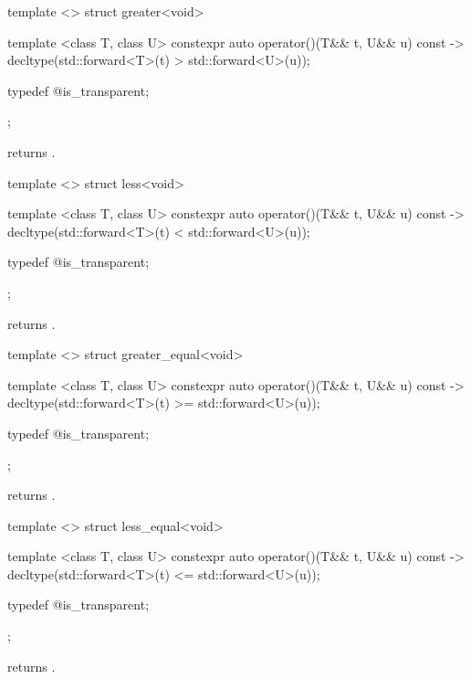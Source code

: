 %
\begin{itemdecl}
template <> struct greater<void> {
  template <class T, class U> constexpr auto operator()(T&& t, U&& u) const
    -> decltype(std::forward<T>(t) > std::forward<U>(u));

  typedef @\unspec@ is_transparent;
};
\end{itemdecl}

\begin{itemdescr}
\pnum
{} returns .
\end{itemdescr}

%
\begin{itemdecl}
template <> struct less<void> {
  template <class T, class U> constexpr auto operator()(T&& t, U&& u) const
    -> decltype(std::forward<T>(t) < std::forward<U>(u));

  typedef @\unspec@ is_transparent;
};
\end{itemdecl}

\begin{itemdescr}
\pnum
{} returns .
\end{itemdescr}

%
\begin{itemdecl}
template <> struct greater_equal<void> {
  template <class T, class U> constexpr auto operator()(T&& t, U&& u) const
    -> decltype(std::forward<T>(t) >= std::forward<U>(u));

  typedef @\unspec@ is_transparent;
};
\end{itemdecl}

\begin{itemdescr}
\pnum
{} returns .
\end{itemdescr}

%
\begin{itemdecl}
template <> struct less_equal<void> {
  template <class T, class U> constexpr auto operator()(T&& t, U&& u) const
    -> decltype(std::forward<T>(t) <= std::forward<U>(u));

  typedef @\unspec@ is_transparent;
};
\end{itemdecl}

\begin{itemdescr}
\pnum
{} returns .
\end{itemdescr}

